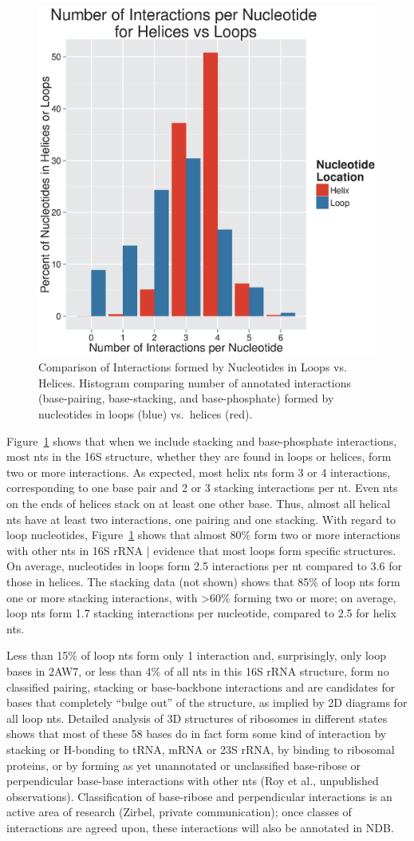 \begin{figure}
  \includegraphics[width=0.5\linewidth]{chapter-1/figs/inter-loop-v-helix}
  \caption{Comparison of Interactions formed by Nucleotides in Loops vs.
  Helices. Histogram comparing number of annotated interactions (base-pairing,
base-stacking, and base-phosphate) formed by nucleotides in loops (blue) vs.\ helices (red).}
\label{fig:ec-inter-loop-v-helix}
\end{figure}

Figure~\ref{fig:ec-inter-loop-v-helix} shows that when we include stacking and
base-phosphate interactions, most nts in the 16S structure, whether they are
found in loops or helices, form two or more interactions. As expected, most
helix nts form 3 or 4 interactions, corresponding to one base pair and 2 or 3
stacking interactions per nt. Even nts on the ends of helices stack on at least
one other base. Thus, almost all helical nts have at least two interactions, one
pairing and one stacking. With regard to loop nucleotides,
Figure~\ref{fig:ec-inter-loop-v-helix} shows that almost 80\% form two or more
interactions with other nts in 16S rRNA | evidence that most loops form specific
structures. On average, nucleotides in loops form
2.5 interactions per nt compared to 3.6 for those in helices. The stacking data
(not shown) shows that 85\% of loop nts form one or more stacking
interactions, with >60\% forming two or more; on average, loop nts form 1.7
stacking interactions per nucleotide, compared to 2.5 for helix nts. 

Less than 15\% of loop nts form only 1 interaction and, surprisingly, only 
loop bases in 2AW7, or less than 4\% of all nts in this 16S rRNA structure, form
no classified pairing, stacking or base-backbone interactions and are candidates
for bases that completely “bulge out” of the structure, as implied by 2D
diagrams for all loop nts. Detailed analysis of 3D structures of ribosomes in
different states shows that most of these 58 bases do in fact form some kind of
interaction by stacking or H-bonding to tRNA, mRNA or 23S rRNA, by binding to
ribosomal proteins, or by forming as yet unannotated or unclassified base-ribose
or perpendicular base-base interactions with other nts (Roy et al., unpublished
observations). Classification of base-ribose and perpendicular interactions is
an active area of research (Zirbel, private communication); once classes of
interactions are agreed upon, these interactions will also be annotated in NDB\@. 

